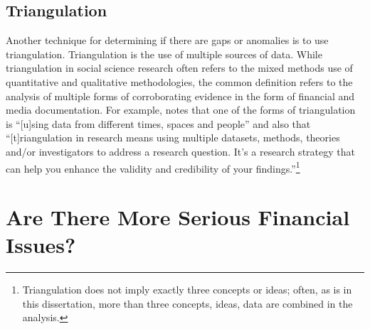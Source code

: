 \subsection{Triangulation}\label{sec:triangulation}\indent

Another technique for determining if there are gaps or anomalies is to use triangulation. Triangulation is the use of multiple sources of data. While triangulation in social science research often refers to the mixed methods use of quantitative and qualitative methodologies, the common definition refers to the analysis of multiple forms of corroborating evidence in the form of financial and media documentation. For example,  \textcite{Bhandari2022} notes that one of the forms of triangulation is ``[u]sing data from different times, spaces and people'' and also that ``[t]riangulation in research means using multiple datasets, methods, theories and/or investigators to address a research question. It’s a research strategy that can help you enhance the validity and credibility of your findings.''\footnote{Triangulation does not imply exactly three concepts or ideas; often, as is in this dissertation, more than three concepts, ideas, data are combined in the analysis.}


\section{Are There More Serious Financial Issues?}\label{serious-problems}\indent

